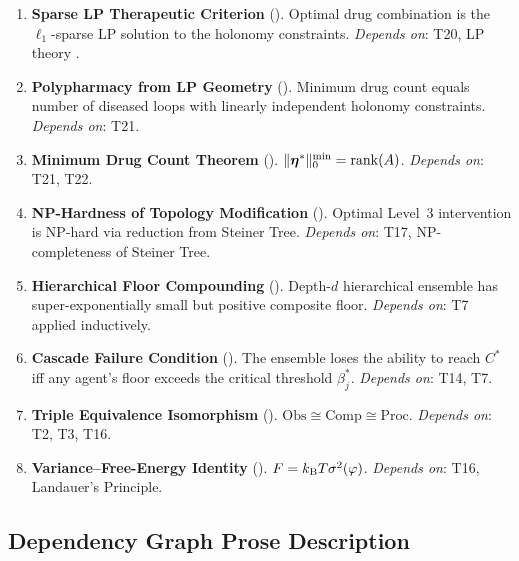 \begin{enumerate}[label=\textbf{T\arabic*.}, leftmargin=3em, itemsep=0.5em]
  \item \textbf{Sparse LP Therapeutic Criterion} ().
    Optimal drug combination is the $\ell_1$-sparse LP solution to the
    holonomy constraints.
    \textit{Depends on}: T20, LP theory \citep{Dantzig1963}.

  \item \textbf{Polypharmacy from LP Geometry} ().
    Minimum drug count equals number of diseased loops with linearly
    independent holonomy constraints.
    \textit{Depends on}: T21.

  \item \textbf{Minimum Drug Count Theorem} ().
    $\|\boldsymbol{\eta}^*\|_0^{\min} = \mathrm{rank}(A)$.
    \textit{Depends on}: T21, T22.

  \item \textbf{NP-Hardness of Topology Modification} ().
    Optimal Level~3 intervention is NP-hard via reduction from Steiner Tree.
    \textit{Depends on}: T17, NP-completeness of Steiner Tree.

  \item \textbf{Hierarchical Floor Compounding} ().
    Depth-$d$ hierarchical ensemble has super-exponentially small but positive
    composite floor.
    \textit{Depends on}: T7 applied inductively.

  \item \textbf{Cascade Failure Condition} ().
    The ensemble loses the ability to reach $C^*$ iff any agent's floor exceeds
    the critical threshold $\beta_j^*$.
    \textit{Depends on}: T14, T7.

  \item \textbf{Triple Equivalence Isomorphism} ().
    $\mathrm{Obs} \cong \mathrm{Comp} \cong \mathrm{Proc}$.
    \textit{Depends on}: T2, T3, T16.

  \item \textbf{Variance--Free-Energy Identity} ().
    $F = k_{\mathrm{B}} T \sigma^2(\varphi)$.
    \textit{Depends on}: T16, Landauer's Principle.

\end{enumerate}

\subsection{Dependency Graph Prose Description}

